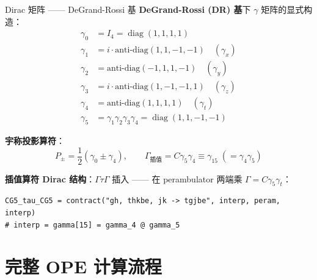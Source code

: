 \documentclass[10pt,aspectratio=169]{beamer}
\begin{document}
\begin{frame}[fragile]{Dirac 矩阵 —— DeGrand-Rossi 基}
\small
\textbf{DeGrand-Rossi (DR) 基}下 $\gamma$ 矩阵的显式构造：
\begin{align}
  \gamma_0 &= I_4 = \operatorname{diag}(1,1,1,1) \\
  \gamma_1 &= i \cdot \text{anti-diag}(1,1,-1,-1) \quad (\gamma_x) \\
  \gamma_2 &= \text{anti-diag}(-1,1,1,-1) \quad (\gamma_y) \\
  \gamma_3 &= i \cdot \text{anti-diag}(1,-1,-1,1) \quad (\gamma_z) \\
  \gamma_4 &= \text{anti-diag}(1,1,1,1) \quad (\gamma_t) \\
  \gamma_5 &= \gamma_1\gamma_2\gamma_3\gamma_4 = \operatorname{diag}(1,1,-1,-1)
\end{align}

\textbf{宇称投影算符}：
\begin{equation}
  P_\pm = \frac{1}{2}(\gamma_0 \pm \gamma_4),\qquad
  \Gamma_{\text{插值}} = C\gamma_5\gamma_4 \equiv \gamma_{15} \;(= \gamma_4\gamma_5)
\end{equation}

\textbf{插值算符 Dirac 结构}：$\Gamma \tau \Gamma$ 插入 —— 在 perambulator 两端乘 $\Gamma = C\gamma_5\gamma_t$：
\begin{lstlisting}
CG5_tau_CG5 = contract("gh, thkbe, jk -> tgjbe", interp, peram, interp)
# interp = gamma[15] = gamma_4 @ gamma_5
\end{lstlisting}
\end{frame}

\section{完整 OPE 计算流程}
\end{document}
